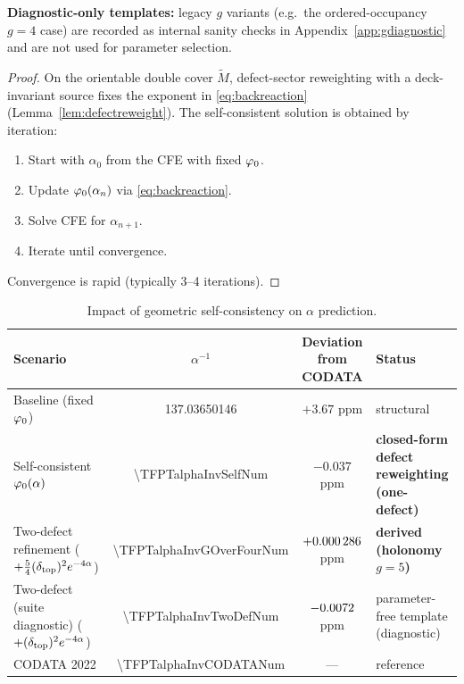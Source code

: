 \begin{remark}
\textbf{Diagnostic-only templates:} legacy $g$ variants (e.g.\ the ordered-occupancy $g=4$ case) are
recorded as internal sanity checks in Appendix~\ref{app:gdiagnostic} and are not used for
parameter selection.
\end{remark}

\begin{proof}
On the orientable double cover $\widetilde{M}$, defect-sector reweighting with a
deck-invariant source fixes the exponent in \eqref{eq:backreaction}
(Lemma~\ref{lem:defectreweight}). The self-consistent solution is obtained by iteration:
\begin{enumerate}
    \item Start with $\alpha_0$ from the CFE with fixed $\varphi_0$.
    \item Update $\varphi_0(\alpha_n)$ via \eqref{eq:backreaction}.
    \item Solve CFE for $\alpha_{n+1}$.
    \item Iterate until convergence.
\end{enumerate}
Convergence is rapid (typically 3--4 iterations).
\end{proof}

\begin{table}[H]
\centering
\small
\setlength{\tabcolsep}{4pt}
\begin{tabularx}{\linewidth}{@{}lccX@{}}
\toprule
\textbf{Scenario} & $\alpha^{-1}$ & \textbf{Deviation from CODATA} & \textbf{Status}\\
\midrule
Baseline (fixed $\varphi_0$) & 137.03650146 & $+3.67$ ppm & structural\\
Self-consistent $\varphi_0(\alpha)$ & \num[round-mode=places,round-precision=10]{\TFPTalphaInvSelfNum} & $-0.037$ ppm & \textbf{closed-form defect reweighting (one-defect)}\\
Two-defect refinement ($+\tfrac54(\delta_{\mathrm{top}})^2 e^{-4\alpha}$) & \num[round-mode=places,round-precision=12]{\TFPTalphaInvGOverFourNum} & $+\num[round-mode=places,round-precision=6]{\TFPTalphaPpmGOverFourNum}$ ppm & \textbf{derived (holonomy $g=5$)}\\
Two-defect (suite diagnostic) ($+(\delta_{\mathrm{top}})^2 e^{-4\alpha}$) & \num[round-mode=places,round-precision=10]{\TFPTalphaInvTwoDefNum} & $\num[round-mode=places,round-precision=4]{\TFPTalphaPpmTwoDefNum}$ ppm & parameter-free template (diagnostic)\\
CODATA 2022 & \num[round-mode=places,round-precision=9]{\TFPTalphaInvCODATANum} & --- & reference\\
\bottomrule
\end{tabularx}
\caption{Impact of geometric self-consistency on $\alpha$ prediction.}
\label{tab:alpha}
\end{table}

\TFPTAlphaAuditTable

